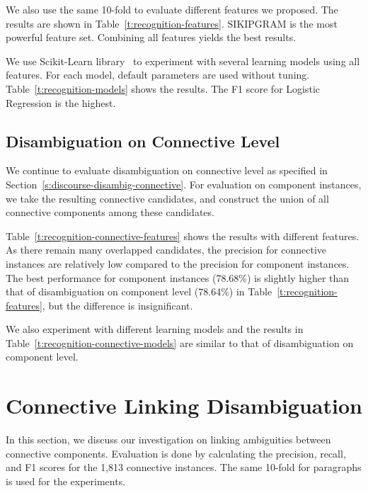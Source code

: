 We also use the same 10-fold to evaluate different features we proposed.
The results are shown in Table~\ref{t:recognition-features}. SIKIPGRAM
is the most powerful feature set. Combining all features yields the best results.



We use Scikit-Learn library~\citep{scikit-learn} to experiment with
several learning models using all features. For each model, default parameters
are used without tuning.
Table~\ref{t:recognition-models} shows the results. The F1 score for Logistic
Regression is the highest.




\subsection{Disambiguation on Connective Level}

We continue to  evaluate disambiguation on connective level as specified in
Section~\ref{s:discourse-disambig-connective}. For evaluation on component instances,
we take the resulting connective candidates, and construct 
the union of all connective components among these candidates.

Table~\ref{t:recognition-connective-features} shows the results with different features.
As there remain many overlapped candidates, the precision for connective instances
are relatively low compared to the precision for component instances. The best performance
for component instances (78.68\%) is slightly higher than that of disambiguation on component level
(78.64\%) in Table~\ref{t:recognition-features}, but the difference is insignificant.



We also experiment with different learning models and the results
in Table~\ref{t:recognition-connective-models} are similar to that of disambiguation on
component level.



\section{Connective Linking Disambiguation}
\label{s:linking-exp}

In this section, we discuss our investigation on linking ambiguities between connective
components. Evaluation is done by calculating the precision, recall, and F1 scores for the
1,813 connective instances.
The same 10-fold for paragraphs is used for the experiments.

